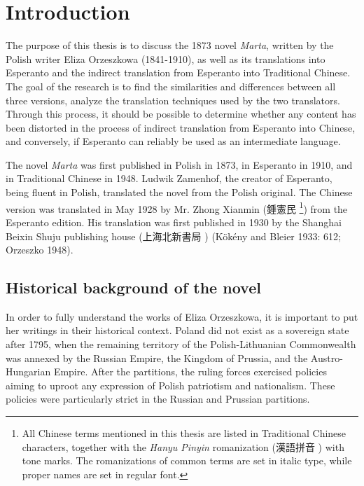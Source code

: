 \chapter{Introduction}

The purpose of this thesis is to discuss the 1873 novel \textit{Marta}, written by the Polish writer Eliza Orzeszkowa (1841-1910), as well as its translations into Esperanto and the indirect translation from Esperanto into Traditional Chinese.
The goal of the research is to find the similarities and differences between all three versions, analyze the translation techniques used by the two translators.
Through this process, it should be possible to determine whether any content has been distorted in the process of indirect translation from Esperanto into Chinese, and conversely, if Esperanto can reliably be used as an intermediate language.

The novel \textit{Marta} was first published in Polish in 1873, in Esperanto in 1910, and in Traditional Chinese in 1948.
Ludwik Zamenhof, the creator of Esperanto, being fluent in Polish, translated the novel from the Polish original.
The Chinese version was translated in May 1928 by Mr. Zhong Xianmin (錘憲民 %
\footnote{All Chinese terms mentioned in this thesis are listed in Traditional Chinese characters, together with the \textit{Hanyu Pinyin} romanization (漢語拼音 ) with tone marks. The romanizations of common terms are set in italic type, while proper names are set in regular font.}) %
from the Esperanto edition.
His translation was first published in 1930 by the Shanghai Beixin Shuju publishing house (上海北新書局 )
(Kökény and Bleier 1933: 612; Orzeszko 1948).

\section{Historical background of the novel}

In order to fully understand the works of Eliza Orzeszkowa, it is important to put her writings in their historical context.
Poland did not exist as a sovereign state after 1795, when the remaining territory of the Polish-Lithuanian Commonwealth was annexed by the Russian Empire, the  Kingdom of Prussia, and the Austro-Hungarian Empire.
After the partitions, the ruling forces exercised policies aiming to uproot any expression of Polish patriotism and nationalism. These policies were particularly strict in the Russian and Prussian partitions.

